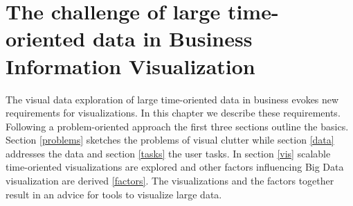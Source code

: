 \chapter{The challenge of large time-oriented data in Business Information Visualization}
\label{chap:BIV}

The visual data exploration of large time-oriented data in business evokes new requirements for visualizations. In this chapter we describe these requirements. Following a problem-oriented approach the first three sections outline the basics. Section \ref{problems} sketches the problems of visual clutter while section \ref{data} addresses the data and section \ref{tasks} the user tasks. In section \ref{vis} scalable time-oriented visualizations are explored and other factors influencing Big Data visualization are derived \ref{factors}. The visualizations and the factors together result in an advice for tools to visualize large data.
